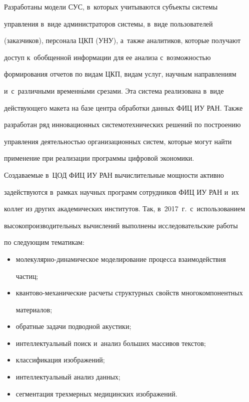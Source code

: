      

     Разработаны модели СУС, в~которых учитываются субъекты системы 

управ\-ле\-ния в~виде администраторов сис\-те\-мы, в~виде пользователей 

(заказчиков), персонала ЦКП (УНУ), а~также аналитиков, которые получают 

доступ к~обобщенной информации для ее анализа с~возможностью 

формирования отчетов по видам ЦКП, видам услуг, научным направлениям 

и~с~различными временн$\acute{\mbox{ы}}$ми срезами. Эта сис\-те\-ма реализована в~виде 

действующего макета на базе цент\-ра обработки данных ФИЦ ИУ РАН. Также 

разработан ряд инновационных системотехнических решений по построению 

управления деятельностью организационных систем, которые могут найти 

применение при реализации программы цифровой экономики.

     

     Создаваемые в~ЦОД ФИЦ ИУ РАН вычислительные мощности активно 

задействуются в~рамках научных программ сотрудников ФИЦ ИУ РАН и~их 

коллег из других академических институтов. Так, в~2017~г.\ с~использованием 

высокопроизводительных вычислений выполнены исследовательские работы 

по следующим тематикам:

     \begin{itemize}

\item молекулярно-динамическое моделирование процесса взаимодействия 

частиц; 

\item квантово-механические расчеты структурных свойств многокомпонентных 

материалов;

\item обратные задачи подводной акустики;

\item интеллектуальный поиск и~анализ больших массивов текстов;

\item классификация изображений;

\item интеллектуальный анализ данных;

\item сегментация трехмерных медицинских изображений.

\end{itemize}



